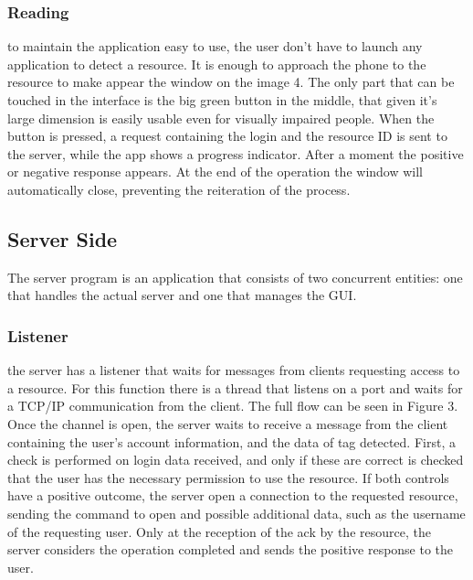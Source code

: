 \documentclass[conference]{IEEEtran}
\begin{document}
\subsubsection{Reading}

to maintain the application easy to use, the user don’t have to launch any application to detect a resource. It is enough to approach the phone to the resource to make appear the window on the image 4. The only part that can be touched in the interface is the big green button in the middle, that given it’s large dimension is easily usable even for visually impaired people. When the button is pressed, a request containing the login and the resource ID is sent to the server, while the app shows a progress indicator. After a moment the positive or negative response appears. At the end of the operation the window will automatically close, preventing the reiteration of the process.

\subsection{Server Side}

The server program is an application that consists of two concurrent entities: one that handles the actual server and one that manages the GUI.

\subsubsection{Listener}

the server has a listener that waits for messages from clients requesting access to a resource. For this function there is a thread that listens on a port and waits for a TCP/IP communication from the client. The full flow can be seen in Figure 3.
Once the channel is open, the server waits to receive a message from the client containing the user's account information, and the data of tag detected. First, a check is performed on login data received, and only if these are correct is checked that the user has the necessary permission to use the resource. If both controls have a positive outcome, the server open a connection to the requested resource, sending the command to open and possible additional data, such as the username of the requesting user. Only at the reception of the ack by the resource, the server considers the operation completed and sends the positive response to the user.
\end{document}
